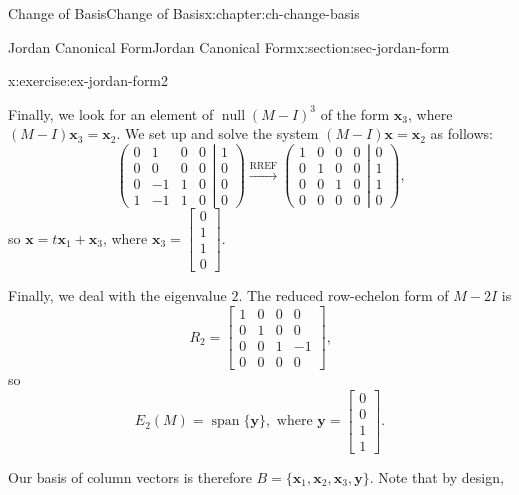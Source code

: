 \documentclass[oneside,10pt,]{book}
\numberwithin{equation}{section}
\newcommand{\spn}{\operatorname{span}}
\newcommand{\bbm}{\begin{bmatrix}}
\newcommand{\ebm}{\end{bmatrix}}
\newcommand{\nll}{\operatorname{null}}
\newcommand{\xx}{\mathbf{x}}
\newcommand{\yy}{\mathbf{y}}
\newcommand{\amp}{&}
\begin{document}
\begin{chapterptx}{Change of Basis}{}{Change of Basis}{}{}{x:chapter:ch-change-basis}
\begin{sectionptx}{Jordan Canonical Form}{}{Jordan Canonical Form}{}{}{x:section:sec-jordan-form}
\begin{inlineexercise}{}{x:exercise:ex-jordan-form2}
\par
Finally, we look for an element of \(\nll (M-I)^3\) of the form \(\xx_3\), where \((M-I)\xx_3=\xx_2\). We set up and solve the system \((M-I)\xx=\xx_2\) as follows:%
\begin{equation*}
\left(\begin{matrix}0\amp 1\amp 0\amp 0\\0\amp 0\amp 0\amp 0\\0\amp -1\amp 1\amp 0\\1\amp -1\amp 1\amp 0\end{matrix}\right|\left.\begin{matrix}1\\0\\0\\0\end{matrix}\right)
\xrightarrow{\text{RREF}}
\left(\begin{matrix} 1\amp 0\amp 0\amp 0\\0\amp 1\amp 0\amp 0\\0\amp 0\amp 1\amp 0\\0\amp 0\amp 0\amp 0\end{matrix}\right|\left.\begin{matrix}0\\1\\1\\0\end{matrix}\right)\text{,}
\end{equation*}
so \(\xx = t\xx_1+\xx_3\), where \(\xx_3 =\bbm 0\\1\\1\\0\ebm\).%
\par
Finally, we deal with the eigenvalue \(2\). The reduced row-echelon form of \(M-2I\) is%
\begin{equation*}
R_2 = \bbm 1\amp 0\amp 0\amp 0\\0\amp 1\amp 0\amp 0\\0\amp 0\amp 1\amp -1\\0\amp 0\amp 0\amp 0\ebm\text{,}
\end{equation*}
so%
\begin{equation*}
E_2(M) = \spn\{\yy\}, \text{ where } \yy = \bbm 0\\0\\1\\1\ebm\text{.}
\end{equation*}
%
\par
Our basis of column vectors is therefore \(B=\{\xx_1,\xx_2,\xx_3,\yy\}\). Note that by design,%

\end{inlineexercise}
\end{sectionptx}
\end{chapterptx}
\end{document}
